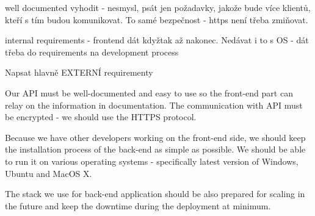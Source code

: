 	well documented vyhodit - nesmysl, psát jen požadavky, jakože bude více klientů, kteří s tím budou komunikovat. To samé bezpečnost - https není třeba zmiňovat.
	
	internal requirements - frontend dát kdyžtak až nakonec. Nedávat i to s OS - dát třeba do requirements na development process
	
	Napsat hlavně EXTERNÍ requirementy
	
	Our API must be well-documented and easy to use so the front-end part can relay on the information in documentation. The communication with API must be encrypted - we should use the HTTPS protocol. 
	
	Because we have other developers working on the front-end side, we should keep the installation process of the back-end as simple as possible. We should be able to run it on various operating systems - specifically latest version of Windows, Ubuntu and MacOS X.
	
	The stack we use for back-end application should be also prepared for scaling in the future and keep the downtime during the deployment at minimum.